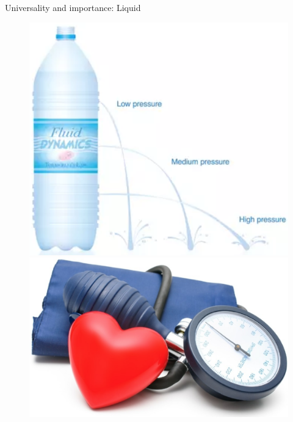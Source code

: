 \documentclass[usenames,dvipsnames]{beamer}
\begin{document}
\begin{frame}{\huge{Universality and importance: Liquid}}
\begin{figure}
          \includegraphics[scale=0.35]{Images/bottle_holes.png}
          \includegraphics[scale=0.2]{Images/blood_pressure.png}
      \end{figure}
\end{frame}
\end{document}
